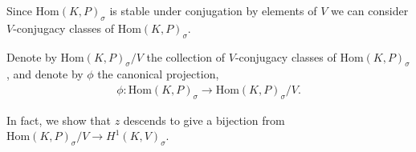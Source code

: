 
Since $\mathrm{Hom}(K, P)_\sigma$ is stable under conjugation by elements of $V$ we can consider $V$-conjugacy classes of $\mathrm{Hom}(K, P)_\sigma$.
\begin{definition} Denote by $\mathrm{Hom}(K, P)_\sigma / V$ the collection of $V$-conjugacy classes of $\mathrm{Hom}(K, P)_\sigma$, and denote by $\phi$ the canonical projection,
\begin{align*} \phi : \mathrm{Hom}(K, P)_\sigma \rightarrow \mathrm{Hom}(K, P)_\sigma / V. \end{align*}
\end{definition}

In fact, we show that $z$ descends to give a bijection from $\mathrm{Hom}(K, P)_\sigma / V \rightarrow H^1(K, V)_\sigma$.

